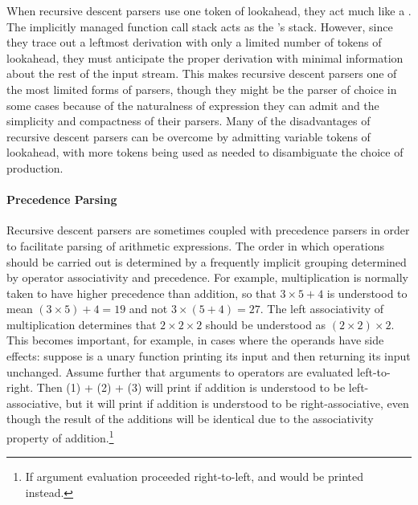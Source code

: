 When recursive descent parsers use one token of lookahead, they act much like a \PDA. The implicitly managed function call stack acts as the \PDA's stack. However, since they trace out a leftmost derivation with only a limited number of tokens of lookahead, they must anticipate the proper derivation with minimal information about the rest of the input stream. This makes recursive descent parsers one of the most limited forms of parsers, though they might be the parser of choice in some cases because of the naturalness of expression they can admit and the simplicity and compactness of their parsers. Many of the disadvantages of recursive descent parsers can be overcome by admitting variable tokens of lookahead, with more tokens being used as needed to disambiguate the choice of production. 

\paragraph{Precedence Parsing}
Recursive descent parsers are sometimes coupled with precedence parsers in order to facilitate parsing of arithmetic expressions. The order in which operations should be carried out is determined by a frequently implicit grouping determined by operator associativity and precedence. For example, multiplication is normally taken to have higher precedence than addition, so that $3 \times 5 + 4$ is understood to mean $(3 \times 5) + 4 = 19$ and not $3 \times (5 + 4) = 27.$ The left associativity of multiplication determines that $2 \times 2 \times 2$ should be understood as $(2 \times 2) \times 2.$ This becomes important, for example, in cases where the operands have side effects: suppose  is a unary function printing its input and then returning its input unchanged. Assume further that arguments to operators are evaluated left-to-right. Then (1) + (2) + (3) will print  if addition is understood to be left-associative, but it will print  if addition is understood to be right-associative, even though the result of the additions will be identical due to the associativity property of addition.\footnote{If argument evaluation proceeded right-to-left,  and  would be printed instead.}

